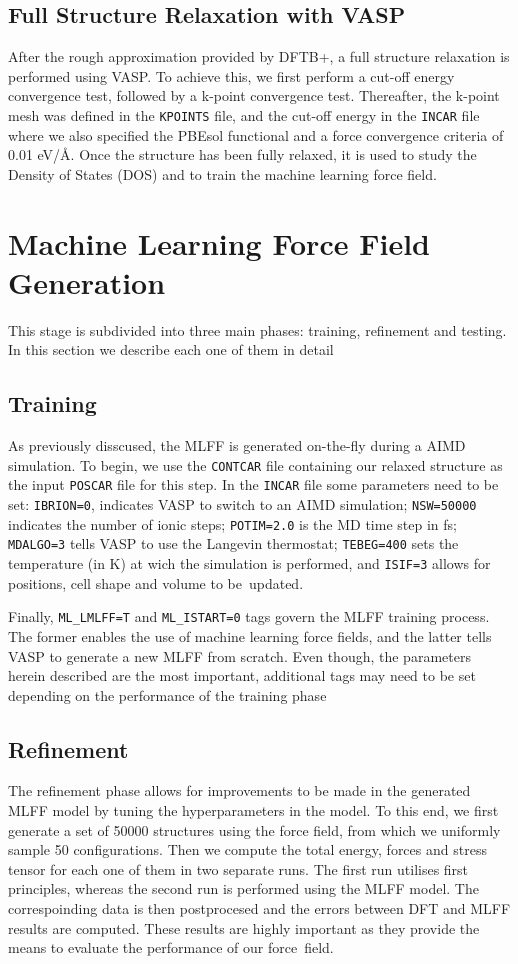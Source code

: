 \subsection{Full Structure Relaxation with VASP}
After the rough approximation provided by DFTB+, a full structure relaxation is performed using VASP. To achieve this, we first perform a cut-off energy convergence test, followed by a k-point convergence test. Thereafter, the k-point mesh was defined in the \texttt{KPOINTS} file, and the cut-off energy in the \texttt{INCAR} file where we also specified the PBEsol functional and a force convergence criteria of 0.01 eV/\AA. Once the structure has been fully relaxed, it is used to study the Density of States (DOS) and to train the machine learning force field.

\section{Machine Learning Force Field Generation}
This stage is subdivided into three main phases: training, refinement and testing. In this section we describe each one of them in detail 
\subsection{Training}
As previously disscused, the MLFF is generated on-the-fly during a AIMD simulation. To begin, we use the \texttt{CONTCAR} file containing our relaxed structure as the input \texttt{POSCAR} file for this step. In the \texttt{INCAR} file some parameters need to be set: \texttt{IBRION=0}, indicates VASP to switch to an AIMD simulation; \texttt{NSW=50000} indicates the number of ionic steps; \texttt{POTIM=2.0} is the MD time step in fs; \texttt{MDALGO=3} tells VASP to use the Langevin thermostat; \texttt{TEBEG=400} sets the temperature (in K) at wich the simulation is performed, and \texttt{ISIF=3} allows for positions, cell shape and volume to be~updated. 

Finally, \texttt{ML\_LMLFF=T} and \texttt{ML\_ISTART=0} tags govern the MLFF training process. The former enables the use of machine learning force fields, and the latter tells VASP to generate a new MLFF from scratch. Even though, the parameters herein described are the most important, additional tags may need to be set depending on the performance of the training phase

\subsection{Refinement}
The refinement phase allows for improvements to be made in the generated MLFF model by tuning the hyperparameters in the model. To this end, we first generate a set of 50000 structures using the force field, from which we uniformly sample 50 configurations. Then we compute the total energy, forces and stress tensor for each one of them in two separate runs. The first run utilises first principles, whereas the second run is performed using the MLFF model. The correspoinding data is then postprocesed and the errors between DFT and MLFF results are computed. These results are highly important as they provide the means to evaluate the performance of our force~field. 


